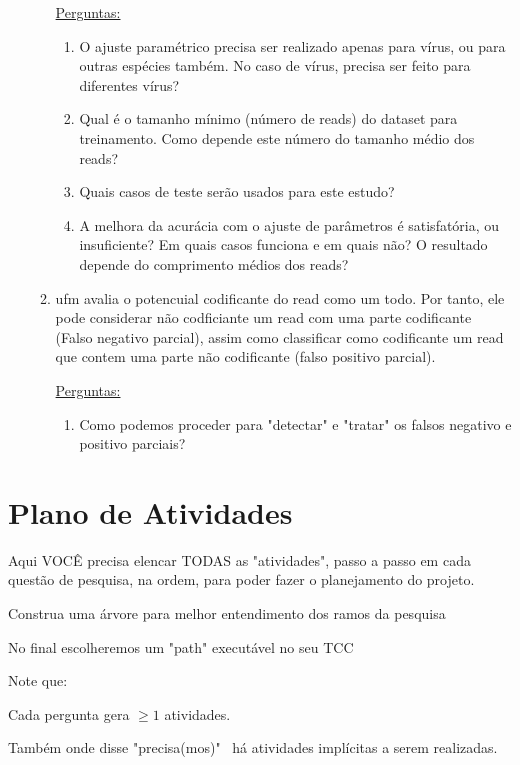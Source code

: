 \documentclass[12pt]{article}
\begin{document}
\begin{enumerate}
\begin{enumerate}
                    \underline{Perguntas:}

                    \begin{enumerate}
                        \item O ajuste paramétrico precisa ser realizado apenas para vírus, ou para outras espécies também. No caso de vírus, precisa ser feito para diferentes vírus?

                        \item Qual é o tamanho mínimo (número de reads) do dataset para treinamento. Como depende este número do tamanho médio dos reads?

                        \item Quais casos de teste serão usados para este estudo?

                        \item A melhora da acurácia com o ajuste de parâmetros é satisfatória, ou insuficiente? Em quais casos funciona e em quais não? O resultado depende do comprimento médios dos reads?

                    \end{enumerate}

              \item \gls{ufm} avalia o potencuial codificante do read como um todo. Por tanto, ele pode considerar não codficiante um read com uma parte codificante (Falso negativo parcial), assim como classificar como codificante um read que contem uma parte não codificante (falso positivo parcial).

                    \underline{Perguntas:}

                    \begin{enumerate}
                        \item Como podemos proceder para "detectar" e "tratar" os falsos negativo e positivo parciais?

                    \end{enumerate}

          \end{enumerate}

\end{enumerate}

\section{Plano de Atividades}

Aqui VOCÊ precisa elencar TODAS as "atividades", passo a passo em cada questão de pesquisa, na ordem, para poder fazer o planejamento do projeto.

Construa uma árvore para melhor entendimento dos ramos da pesquisa

No final escolheremos um "path" executável no seu TCC

Note que:

Cada pergunta gera $\ge 1$ atividades.

Também onde disse "precisa(mos)" \ há atividades implícitas a serem realizadas.
\end{document}
